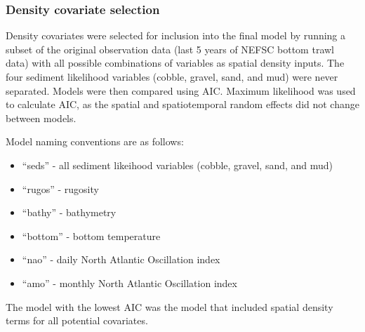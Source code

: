 \documentclass[
]{article}
\providecommand{\tightlist}{%
  \setlength{\itemsep}{0pt}\setlength{\parskip}{0pt}}
\begin{document}
\hypertarget{density-covariate-selection}{%
\subsubsection{Density covariate selection}\label{density-covariate-selection}}

Density covariates were selected for inclusion into the final model by running a subset of the original observation data (last 5 years of NEFSC bottom trawl data) with all possible combinations of variables as spatial density inputs. The four sediment likelihood variables (cobble, gravel, sand, and mud) were never separated. Models were then compared using AIC. Maximum likelihood was used to calculate AIC, as the spatial and spatiotemporal random effects did not change between models.

Model naming conventions are as follows:

\begin{itemize}
\tightlist
\item
  ``seds'' - all sediment likeihood variables (cobble, gravel, sand, and mud)
\item
  ``rugos'' - rugosity
\item
  ``bathy'' - bathymetry
\item
  ``bottom'' - bottom temperature
\item
  ``nao'' - daily North Atlantic Oscillation index
\item
  ``amo'' - monthly North Atlantic Oscillation index
\end{itemize}

The model with the lowest AIC was the model that included spatial density terms for all potential covariates.
\end{document}

